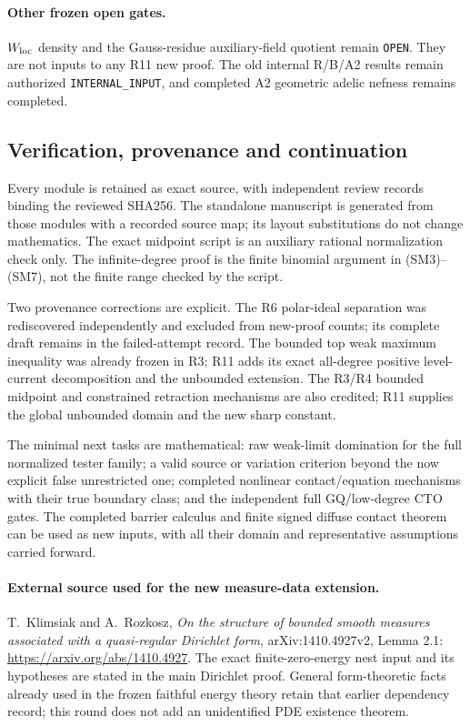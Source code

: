 \paragraph{Other frozen open gates.}
$W_{\rm loc}$ density and the Gauss-residue
auxiliary-field quotient remain
\texttt{OPEN}.  They are not inputs to
any R11 new proof.
The old internal R/B/A2 results remain
authorized \texttt{INTERNAL\_INPUT},
and completed A2 geometric adelic
nefness remains completed.

\subsection{Verification, provenance and continuation}

Every module is retained as exact source,
with independent review records binding
the reviewed SHA256.
The standalone manuscript is generated
from those modules with a recorded source
map; its layout substitutions do not
change mathematics.
The exact midpoint script is an auxiliary
rational normalization check only.
The infinite-degree proof is the finite
binomial argument in (SM3)--(SM7), not
the finite range checked by the script.

Two provenance corrections are explicit.
The R6 polar-ideal separation was
rediscovered independently and excluded
from new-proof counts; its complete
draft remains in the failed-attempt record.
The bounded top weak maximum inequality
was already frozen in R3; R11 adds its
exact all-degree positive level-current
decomposition and the unbounded extension.
The R3/R4 bounded midpoint and constrained
retraction mechanisms are also credited;
R11 supplies the global unbounded domain
and the new sharp constant.

The minimal next tasks are mathematical:
raw weak-limit domination for the full
normalized tester family; a valid source
or variation criterion beyond the now
explicit false unrestricted one; completed
nonlinear contact/equation mechanisms with
their true boundary class; and the
independent full GQ/low-degree CTO gates.
The completed barrier calculus and
finite signed diffuse contact theorem
can be used as new inputs, with all their
domain and representative assumptions
carried forward.

\paragraph{External source used for the new measure-data extension.}
T.~Klimsiak and A.~Rozkosz,
\emph{On the structure of bounded smooth measures
associated with a quasi-regular Dirichlet form},
arXiv:1410.4927v2, Lemma 2.1:
\url{https://arxiv.org/abs/1410.4927}.
The exact finite-zero-energy nest input and
its hypotheses are stated in the main
Dirichlet proof.  General form-theoretic
facts already used in the frozen faithful
energy theory retain that earlier dependency
record; this round does not add an
unidentified PDE existence theorem.
